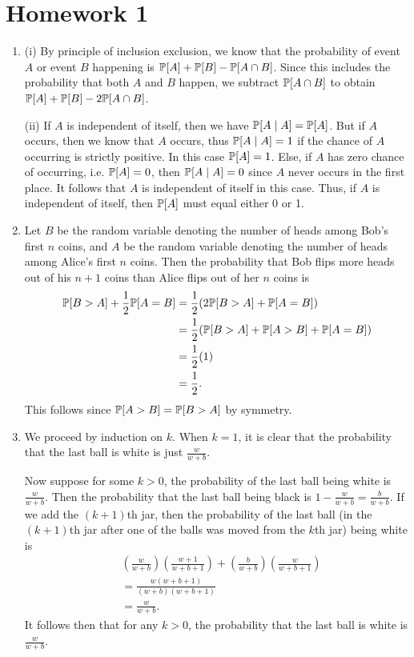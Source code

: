 \section{Homework 1}

\begin{enumerate}
    \item (i) By principle of inclusion exclusion, we know that the probability of event $A$ or event $B$ happening is $\P[A] + \P[B] - \P[A \cap B]$. Since this includes the probability that both $A$ and $B$ happen, we subtract $\P[A \cap B]$ to obtain $\P[A] + \P[B] - 2\P[A \cap B]$.
    
    (ii) If $A$ is independent of itself, then we have $\P[A \mid A] = \P[A]$. But if $A$ occurs, then we know that $A$ occurs, thus $\P[A \mid A] = 1$ if the chance of $A$ occurring is strictly positive. In this case $\P[A] = 1$. Else, if $A$ has zero chance of occurring, i.e. $\P[A] = 0$, then $\P[A \mid A] = 0$ since $A$ never occurs in the first place. It follows that $A$ is independent of itself in this case. Thus, if $A$ is independent of itself, then $\P[A]$ must equal either 0 or 1.
    
    \item Let $B$ be the random variable denoting the number of heads among Bob's first $n$ coins, and $A$ be the random variable denoting the number of heads among Alice's first $n$ coins. Then the probability that Bob flips more heads out of his $n + 1$ coins than Alice flips out of her $n$ coins is
    \begin{align*}
        \P[B > A] + \frac{1}{2}\P[A = B] &= \frac{1}{2}(2\P[B > A] + \P[A = B]) \\
            &= \frac{1}{2}(\P[B > A] + \P[A > B] + \P[A = B]) \\
            &= \frac{1}{2}(1) \\
            &= \frac{1}{2}.
    \end{align*}
    This follows since $\P[A > B] = \P[B > A]$ by symmetry.
    
    \item We proceed by induction on $k$. When $k = 1$, it is clear that the probability that the last ball is white is just $\frac{w}{w + b}$.
    
    Now suppose for some $k > 0$, the probability of the last ball being white is $\frac{w}{w + b}$. Then the probability that the last ball being black is $1 - \frac{w}{w + b} = \frac{b}{w + b}$. If we add the $(k+1)$th jar, then the probability of the last ball (in the $(k + 1)$th jar after one of the balls was moved from the $k$th jar) being white is
    \begin{align*}
     &\left(\frac{w}{w + b}\right)\left(\frac{w + 1}{w + b + 1}\right) + \left(\frac{b}{w + b}\right)\left(\frac{w}{w + b + 1}\right) \\
    &= \frac{w(w + b + 1)}{(w + b)(w + b + 1)} \\
    &= \frac{w}{w + b}.
    \end{align*}
    It follows then that for any $k > 0$, the probability that the last ball is white is $\frac{w}{w + b}$.
    

\end{enumerate}
